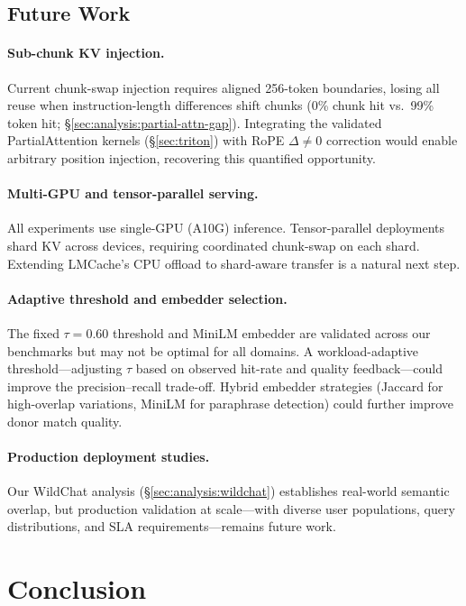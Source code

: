 \documentclass[10pt,twocolumn]{article}
\begin{document}
\subsection{Future Work}\label{sec:future-work}

\paragraph{Sub-chunk KV injection.}
Current chunk-swap injection requires aligned 256-token boundaries,
losing all reuse when instruction-length differences shift chunks
(0\% chunk hit vs.\ 99\% token hit; \S\ref{sec:analysis:partial-attn-gap}).
Integrating the validated PartialAttention kernels (\S\ref{sec:triton})
with RoPE $\Delta{\neq}0$ correction would enable arbitrary
position injection, recovering this quantified opportunity.

\paragraph{Multi-GPU and tensor-parallel serving.}
All experiments use single-GPU (A10G) inference. Tensor-parallel
deployments shard KV across devices, requiring coordinated chunk-swap
on each shard. Extending LMCache's CPU offload to shard-aware transfer
is a natural next step.

\paragraph{Adaptive threshold and embedder selection.}
The fixed $\tau{=}0.60$ threshold and MiniLM embedder are validated
across our benchmarks but may not be optimal for all domains.
A workload-adaptive threshold---adjusting $\tau$ based on observed
hit-rate and quality feedback---could improve the precision--recall
trade-off. Hybrid embedder strategies (Jaccard for high-overlap
variations, MiniLM for paraphrase detection) could further improve
donor match quality.

\paragraph{Production deployment studies.}
Our WildChat analysis (\S\ref{sec:analysis:wildchat}) establishes real-world
semantic overlap, but production validation at scale---with diverse
user populations, query distributions, and SLA requirements---remains
future work.

\section{Conclusion}
\label{sec:conclusion}
\end{document}
